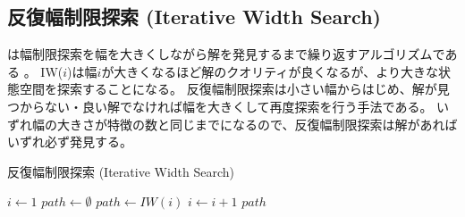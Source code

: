\subsection{反復幅制限探索 (Iterative Width Search)}
\label{sec:iterative-width-search}

は幅制限探索を幅を大きくしながら解を発見するまで繰り返すアルゴリズムである \cite{lipovetzkyg12}。
IW($i$)は幅$i$が大きくなるほど解のクオリティが良くなるが、より大きな状態空間を探索することになる。
反復幅制限探索は小さい幅からはじめ、解が見つからない・良い解でなければ幅を大きくして再度探索を行う手法である。
いずれ幅の大きさが特徴の数と同じまでになるので、反復幅制限探索は解があればいずれ必ず発見する。

\begin{algorithm}
\caption{反復幅制限探索 (Iterative Width Search)}
$i \leftarrow 1$\;
$path \leftarrow \emptyset$\;
	 {
		$path \leftarrow IW(i)$\;
		$i \leftarrow i + 1$\;
	}
	\Return $path$
\end{algorithm}

\begin{comment}

\subsection{Best-First Width Search (最良優先幅制限探索)}
\label{sec:width-based-heuristic-search}

\cite{geffner2015}


\subsection{Novelty Heuristics (新奇性に基づくヒューリスティック)}
\label{sec:novelty-heuristics}

ここまでの議論では新奇性を枝刈りのために使った。
しかしノードを捨ててしまう枝刈りは解が存在する問題でも解を発見できなくなってしまうという問題がある。
新奇性を使ってノードを完全に捨ててしまうのではなく、新奇性に基づいてノードを展開する優先度を決めるというアプローチをとることができる \cite{geffner2015}。つまり新奇性をヒューリスティックに使うということである。
この方法ではノードは完全に捨てられることはないので解を捨ててしまう可能性はなくなる。

ここで注意しなければならないのは新奇性は生成済みノード集合に依存する値である。
つまり新奇性に基づくヒューリスティック関数は状態$s$の関数ではなく、状態とクローズドリストの関数となる。つまり、同じ状態のノードでもヒューリスティック値が異なる場合がある。

\end{comment}

